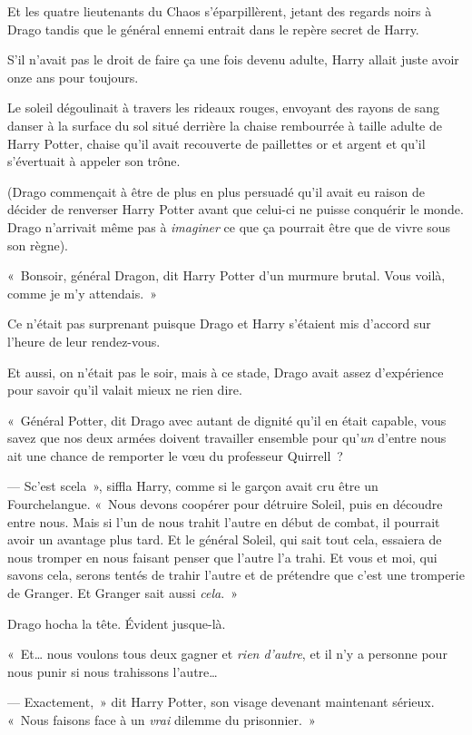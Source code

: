 Et les quatre lieutenants du Chaos s'éparpillèrent, jetant des regards noirs à Drago tandis que le général ennemi entrait dans le repère secret de Harry.

S'il n'avait pas le droit de faire ça une fois devenu adulte, Harry allait juste avoir onze ans pour toujours.

\later

Le soleil dégoulinait à travers les rideaux rouges, envoyant des rayons de sang danser à la surface du sol situé derrière la chaise rembourrée à taille adulte de Harry Potter, chaise qu'il avait recouverte de paillettes or et argent et qu'il s'évertuait à appeler son trône.

(Drago commençait à être de plus en plus persuadé qu'il avait eu raison de décider de renverser Harry Potter avant que celui-ci ne puisse conquérir le monde.
Drago n'arrivait même pas à \emph{imaginer} ce que ça pourrait être que de vivre sous son règne).

«~Bonsoir, général Dragon, dit Harry Potter d'un murmure brutal.
Vous voilà, comme je m'y attendais.~»

Ce n'était pas surprenant puisque Drago et Harry s'étaient mis d'accord sur l'heure de leur rendez-vous.

Et aussi, on n'était pas le soir, mais à ce stade, Drago avait assez d'expérience pour savoir qu'il valait mieux ne rien dire.

«~Général Potter, dit Drago avec autant de dignité qu'il en était capable, vous savez que nos deux armées doivent travailler ensemble pour qu'\emph{un} d'entre nous ait une chance de remporter le vœu du professeur Quirrell~?

--- Sc'est scela~», siffla Harry, comme si le garçon avait cru être un Fourchelangue.
«~Nous devons coopérer pour détruire Soleil, puis en découdre entre nous.
Mais si l'un de nous trahit l'autre en début de combat, il pourrait avoir un avantage plus tard.
Et le général Soleil, qui sait tout cela, essaiera de nous tromper en nous faisant penser que l'autre l'a trahi.
Et vous et moi, qui savons cela, serons tentés de trahir l'autre et de prétendre que c'est une tromperie de Granger.
Et Granger sait aussi \emph{cela}.~»

Drago hocha la tête.
Évident jusque-là.

«~Et… nous voulons tous deux gagner et \emph{rien d'autre}, et il n'y a personne pour nous punir si nous trahissons l'autre…

--- Exactement,~» dit Harry Potter, son visage devenant maintenant sérieux.
«~Nous faisons face à un \emph{vrai} dilemme du prisonnier.~»

